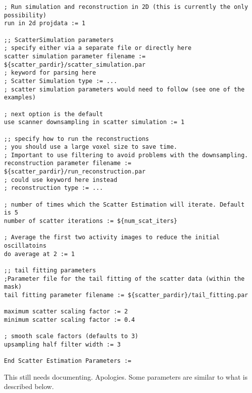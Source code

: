 \documentclass{article}
\begin{document}
\begin{verbatim}
; Run simulation and reconstruction in 2D (this is currently the only possibility)
run in 2d projdata := 1

;; ScatterSimulation parameters
; specify either via a separate file or directly here
scatter simulation parameter filename := ${scatter_pardir}/scatter_simulation.par
; keyword for parsing here
; Scatter Simulation type := ...
; scatter simulation parameters would need to follow (see one of the examples)

; next option is the default
use scanner downsampling in scatter simulation := 1

;; specify how to run the reconstructions
; you should use a large voxel size to save time.
; Important to use filtering to avoid problems with the downsampling.
reconstruction parameter filename := ${scatter_pardir}/run_reconstruction.par 
; could use keyword here instead
; reconstruction type := ...

; number of times which the Scatter Estimation will iterate. Default is 5
number of scatter iterations := ${num_scat_iters}

; Average the first two activity images to reduce the initial oscillatoins
do average at 2 := 1

;; tail fitting parameters
;Parameter file for the tail fitting of the scatter data (within the mask)
tail fitting parameter filename := ${scatter_pardir}/tail_fitting.par

maximum scatter scaling factor := 2 
minimum scatter scaling factor := 0.4

; smooth scale factors (defaults to 3)
upsampling half filter width := 3

End Scatter Estimation Parameters :=
\end{verbatim}
This still needs documenting. Apologies.
Some parameters are
similar to what is described below.
\end{document}
